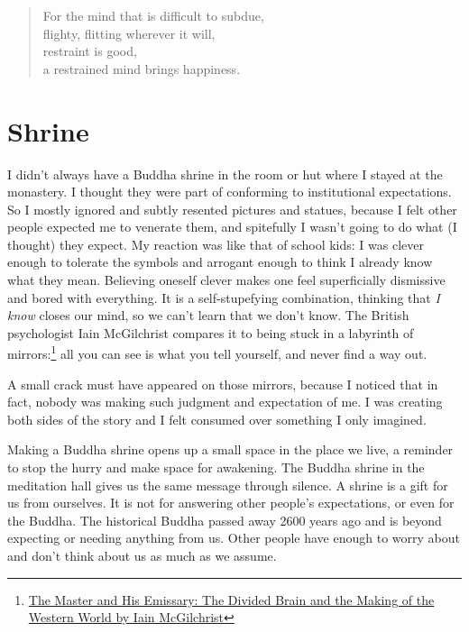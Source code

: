 \begin{quote}
For the mind that is difficult to subdue,\\
flighty, flitting wherever it will,\\
restraint is good,\\
a restrained mind brings happiness.

\bigskip

\end{quote}

\clearpage

\section{Shrine}


I didn't always have a Buddha shrine in the room or hut where I stayed
at the monastery. I thought they were part of conforming to
institutional expectations. So I mostly ignored and subtly resented
pictures and statues, because I felt other people expected me to
venerate them, and spitefully I wasn't going to do what (I thought) they
expect. My reaction was like that of school kids: I was clever enough to
tolerate the symbols and arrogant enough to think I already know what
they mean. Believing oneself clever makes one feel superficially
dismissive and bored with everything. It is a self-stupefying
combination, thinking that \emph{I know} closes our mind, so we can't
learn that we don't know. The British psychologist Iain McGilchrist
compares it to being stuck in a labyrinth of mirrors:\footnote{\href{https://www.goodreads.com/book/show/6968772-the-master-and-his-emissary}{The
  Master and His Emissary: The Divided Brain and the Making of the
  Western World by Iain McGilchrist}} all you can see is what you tell
yourself, and never find a way out.

A small crack must have appeared on those mirrors, because I noticed
that in fact, nobody was making such judgment and expectation of me. I
was creating both sides of the story and I felt consumed over something
I only imagined.

Making a Buddha shrine opens up a small space in the place we live, a
reminder to stop the hurry and make space for awakening. The Buddha
shrine in the meditation hall gives us the same message through silence.
A shrine is a gift for us from ourselves. It is not for answering other
people's expectations, or even for the Buddha. The historical Buddha
passed away 2600 years ago and is beyond expecting or needing anything
from us. Other people have enough to worry about and don't think about
us as much as we assume.

